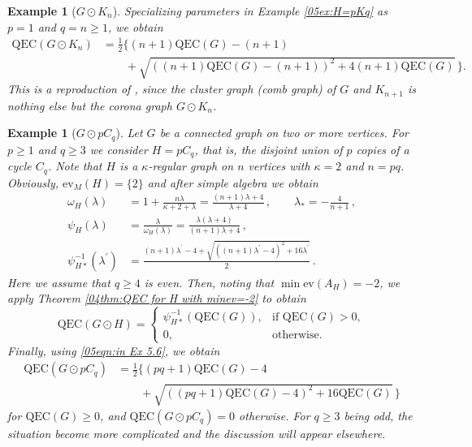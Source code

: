 \documentclass[12pt,a4paper]{article}
\newtheorem{example}[theorem]{Example}
\newcommand{\1}{{\bm 1}}
\numberwithin{equation}{section}
\begin{document}
\begin{example}[$G\odot K_n$]
\label{05ex:H=Kn}\normalfont
Specializing parameters in Example \ref{05ex:H=pKq} as $p=1$
and $q=n\ge1$, we obtain
\begin{align*}
\mathrm{QEC}(G\odot K_n)
&=\frac{1}{2} \Big\{(n+1)\mathrm{QEC}(G)-(n+1)
\\
&\qquad 
+\sqrt{((n+1)\mathrm{QEC}(G)-(n+1))^2+4(n+1)\mathrm{QEC}(G)}\,\Big\}.
\end{align*}
%
This is a reproduction of \cite[Theorem 1.6]{Choudhury-Nandi2023},
since the cluster graph (comb graph) of $G$ and $K_{n+1}$
is nothing else but the corona graph $G\odot K_n$.
\end{example}


\begin{example}[$G\odot pC_q$]
\label{05ex:H=pCq}\normalfont
Let $G$ be a connected graph on two or more vertices.
For $p\ge1$ and $q\ge3$
we consider $H=pC_q$, that is, the disjoint union of 
$p$ copies of a cycle $C_q$.
Note that $H$ is a $\kappa$-regular graph on $n$ vertices
with $\kappa=2$ and $n=pq$.
Obviously, $\mathrm{ev}_M(H)=\{2\}$ and after simple algebra we obtain
%
\begin{align}
\omega_H(\lambda)
&=1+\frac{n\lambda}{\kappa+2+\lambda}
 =\frac{(n+1)\lambda+4}{\lambda+4}\,,
\qquad
\lambda_*=-\frac{4}{n+1}\,,
\nonumber \\[6pt]
\psi_H(\lambda)
&=\frac{\lambda}{\omega_H(\lambda)}
=\frac{\lambda(\lambda+4)}{(n+1)\lambda+4}\,,
\nonumber \\[6pt]
\psi_{H*}^{-1}(\lambda^\prime)
&=\frac{(n+1)\lambda^\prime-4+\sqrt{
((n+1)\lambda^\prime-4)^2+16\lambda^\prime}}{2}\,.
\label{05eqn:in Ex 5.6}
\end{align}
%
Here we assume that $q\ge4$ is even.
Then, noting that $\min\mathrm{ev}(A_H)=-2$,
we apply Theorem \ref{04thm:QEC for H with minev=-2} to obtain
\[
\mathrm{QEC}(G\odot H)
=\begin{cases}
\psi_{H*}^{-1}(\mathrm{QEC}(G)), & \text{if $\mathrm{QEC}(G)>0$}, \\
0, & \text{otherwise}.
\end{cases}
\]
Finally, using \eqref{05eqn:in Ex 5.6}, we obtain
%
\begin{align*}
\mathrm{QEC}(G\odot pC_q)
&=\frac{1}{2} \Big\{(pq+1)\mathrm{QEC}(G)-4
\\
&\qquad 
+\sqrt{((pq+1)\mathrm{QEC}(G)-4)^2+16\mathrm{QEC}(G)}\,\Big\}
\end{align*}
%
for $\mathrm{QEC}(G)\ge0$, and
$\mathrm{QEC}(G\odot pC_q)=0$ otherwise.
For $q\ge3$ being odd, the situation become more complicated
and the discussion will appear elsewhere.
\end{example}
\end{document}
